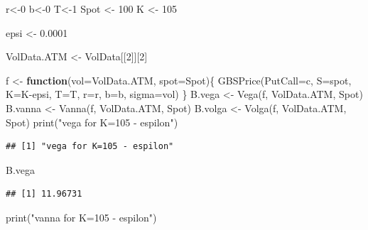 \documentclass[
]{article}
\newenvironment{Shaded}{\begin{snugshade}}{\end{snugshade}}
\newcommand{\AttributeTok}[1]{\textcolor[rgb]{0.77,0.63,0.00}{#1}}
\newcommand{\ControlFlowTok}[1]{\textcolor[rgb]{0.13,0.29,0.53}{\textbf{#1}}}
\newcommand{\DecValTok}[1]{\textcolor[rgb]{0.00,0.00,0.81}{#1}}
\newcommand{\FloatTok}[1]{\textcolor[rgb]{0.00,0.00,0.81}{#1}}
\newcommand{\FunctionTok}[1]{\textcolor[rgb]{0.00,0.00,0.00}{#1}}
\newcommand{\NormalTok}[1]{#1}
\newcommand{\OtherTok}[1]{\textcolor[rgb]{0.56,0.35,0.01}{#1}}
\newcommand{\SpecialCharTok}[1]{\textcolor[rgb]{0.00,0.00,0.00}{#1}}
\newcommand{\StringTok}[1]{\textcolor[rgb]{0.31,0.60,0.02}{#1}}
\begin{document}
\begin{Shaded}
\begin{Highlighting}[]
\NormalTok{r}\OtherTok{\textless{}{-}}\DecValTok{0}
\NormalTok{b}\OtherTok{\textless{}{-}}\DecValTok{0}
\NormalTok{T}\OtherTok{\textless{}{-}}\DecValTok{1}
\NormalTok{Spot }\OtherTok{\textless{}{-}} \DecValTok{100}
\NormalTok{K }\OtherTok{\textless{}{-}} \DecValTok{105}

\NormalTok{epsi }\OtherTok{\textless{}{-}} \FloatTok{0.0001}


\NormalTok{VolData.ATM }\OtherTok{\textless{}{-}}\NormalTok{ VolData[[}\DecValTok{2}\NormalTok{]][}\DecValTok{2}\NormalTok{]}

\NormalTok{f }\OtherTok{\textless{}{-}} \ControlFlowTok{function}\NormalTok{(}\AttributeTok{vol=}\NormalTok{VolData.ATM, }\AttributeTok{spot=}\NormalTok{Spot)\{}
  \FunctionTok{GBSPrice}\NormalTok{(}\AttributeTok{PutCall=}\StringTok{\textquotesingle{}c\textquotesingle{}}\NormalTok{, }\AttributeTok{S=}\NormalTok{spot, }\AttributeTok{K=}\NormalTok{K}\SpecialCharTok{{-}}\NormalTok{epsi, }\AttributeTok{T=}\NormalTok{T, }\AttributeTok{r=}\NormalTok{r, }\AttributeTok{b=}\NormalTok{b, }\AttributeTok{sigma=}\NormalTok{vol)}
\NormalTok{\}}
\NormalTok{B.vega }\OtherTok{\textless{}{-}} \FunctionTok{Vega}\NormalTok{(f, VolData.ATM, Spot)}
\NormalTok{B.vanna }\OtherTok{\textless{}{-}} \FunctionTok{Vanna}\NormalTok{(f, VolData.ATM, Spot)}
\NormalTok{B.volga }\OtherTok{\textless{}{-}} \FunctionTok{Volga}\NormalTok{(f, VolData.ATM, Spot)}
\FunctionTok{print}\NormalTok{(}\StringTok{"vega for K=105 {-} espilon"}\NormalTok{)}
\end{Highlighting}
\end{Shaded}

\begin{verbatim}
## [1] "vega for K=105 - espilon"
\end{verbatim}

\begin{Shaded}
\begin{Highlighting}[]
\NormalTok{B.vega}
\end{Highlighting}
\end{Shaded}

\begin{verbatim}
## [1] 11.96731
\end{verbatim}

\begin{Shaded}
\begin{Highlighting}[]
\FunctionTok{print}\NormalTok{(}\StringTok{"vanna for K=105 {-} espilon"}\NormalTok{)}
\end{Highlighting}
\end{Shaded}
\end{document}
